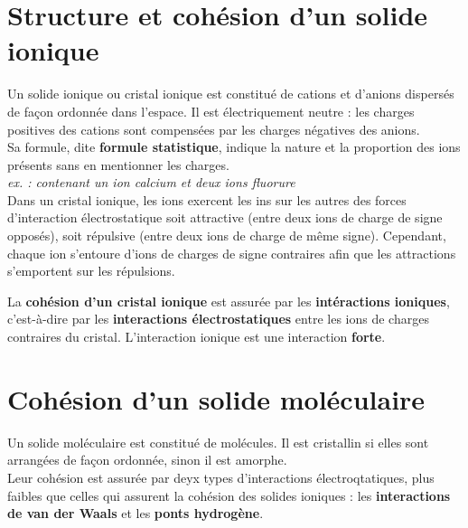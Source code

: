 \documentclass[a4paper,11pt,fleqn]{scrartcl}%
\begin{document}
	\maketitle
\section{Structure et cohésion d'un solide ionique}
Un solide ionique ou cristal ionique est constitué de cations et d'anions dispersés de façon ordonnée dans l'espace. Il est électriquement neutre : les charges positives des cations sont compensées par les charges négatives des anions.\\
Sa formule, dite \textbf{formule statistique}, indique la nature et la proportion des ions présents sans en mentionner les charges.\\
\textit{ex. :  contenant un ion calcium  et deux ions fluorure }\\
Dans un cristal ionique, les ions exercent les ins sur les autres des forces d'interaction électrostatique soit attractive (entre deux ions de charge de signe opposés), soit répulsive (entre deux ions de charge de même signe). Cependant, chaque ion s'entoure d'ions de charges de signe contraires afin que les attractions s'emportent sur les répulsions.\\
\begin{cours}
    La \textbf{cohésion d'un cristal ionique} est assurée par les \textbf{intéractions ioniques}, c'est-à-dire par les \textbf{interactions électrostatiques} entre les ions de charges contraires du cristal. L'interaction ionique est une interaction \textbf{forte}.
\end{cours}

\section{Cohésion d'un solide moléculaire}
Un solide moléculaire est constitué de molécules. Il est cristallin si elles sont arrangées de façon ordonnée, sinon il est amorphe.\\
Leur cohésion est assurée par deyx types d'interactions électroqtatiques, plus faibles que celles qui assurent la cohésion des solides ioniques : les \textbf{interactions de van der Waals} et les \textbf{ponts hydrogène}.
\end{document}
